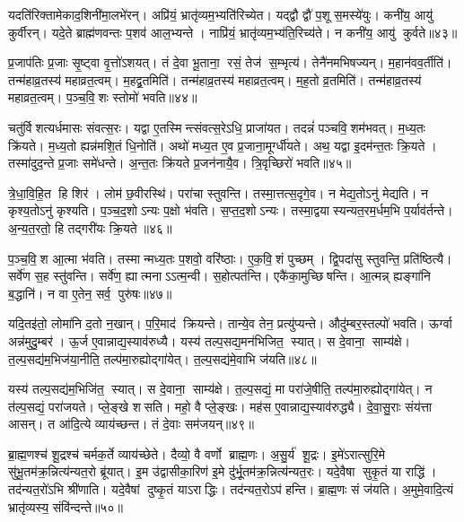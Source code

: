 यदति॑रिक्तामेकाद॒शिनी॑मा॒लभे॑रन्। अप्रि॑यं॒ भ्रातृ॑व्यम॒भ्यति॑\-रिच्येत। यद्द्वौ द्वौ॑ प॒शू स॒मस्ये॑युः। कनी॑य॒ आयु॑ कुर्वीरन्। यदे॒ते ब्राह्म॑णवन्तः प॒शव॑ आल॒भ्यन्ते। नाप्रि॑यं॒ भ्रातृ॑व्यम॒भ्य॑ति॒रिच्य॑ते। न कनी॑य॒ आयु॑ कुर्वते॥४३॥\anuvakamend[ते ए॒वाल॑भन्ते मैत्रावरु॒णीमाल॑भ॒न्तेऽव॑रुद्ध्यै स॒प्त च॑]

प्र॒जाप॑तिः प्र॒जाः सृ॒ष्ट्वा वृ॒त्तो॑ऽशयत्। तं दे॒वा भू॒ताना॒ रसं॒ तेज॑ स॒म्भृत्य॑। तेनै॑नमभिषज्यन्। म॒हान॑वव॒र्तीति॑। तन्म॑हाव्र॒तस्य॑ महाव्रत॒त्वम्। म॒हद्व्र॒तमिति॑। तन्म॑हाव्र॒तस्य॑ महाव्रत॒त्वम्। म॒ह॒तो व्र॒तमिति॑। तन्म॑हाव्र॒तस्य॑ महाव्रत॒त्वम्। प॒ञ्च॒वि॒शः स्तोमो॑ भवति॥४४॥

चतु॑र्विशत्यर्धमासः संवत्स॒रः। यद्वा ए॒तस्मिन्त्संवत्स॒रेऽधि॒ प्राजा॑यत। तदन्नं॑ पञ्चवि॒शम॑भवत्। म॒ध्य॒तः क्रि॑यते। म॒ध्य॒तो ह्यन्न॑मशि॒तं धि॒नोति॑। अथो॑ मध्य॒त ए॒व प्र॒जाना॒मूर्ग्धी॑यते। अथ॒ यद्वा इ॒दम॑न्त॒तः क्रि॒यते। तस्मा॑दुद॒न्ते प्र॒जाः समे॑धन्ते। अ॒न्त॒तः क्रि॑यते प्र॒जन॑नायै॒व। त्रि॒वृच्छिरो॑ भवति॥४५॥

त्रे॒धा॒वि॒हि॒त हि शिर॑। लोम॑ छ॒वीरस्थि॑। परा॑चा स्तुवन्ति। तस्मा॒त्तत्स॒दृगे॒व। न मेद्य॒तोऽनु॑ मेद्यति। न कृश्य॒तोऽनु॑ कृश्यति। प॒ञ्च॒द॒शोऽन्यः प॒क्षो भ॑वति। स॒प्त॒द॒शोऽन्यः। तस्मा॒द्वयास्यन्यत॒रम॒र्धम॒भि प॒र्याव॑र्तन्ते। अ॒न्य॒त॒रतो॒ हि तद्गरी॑यः क्रि॒यते॥४६॥

प॒ञ्च॒वि॒श आ॒त्मा भ॑वति। तस्मान्मध्य॒तः प॒शवो॒ वरि॑ष्ठाः। ए॒क॒वि॒शं पुच्छम्। द्वि॒पदा॑सु स्तुवन्ति॒ प्रति॑ष्ठित्यै। सर्वे॑ण स॒ह स्तु॑वन्ति। सर्वे॑ण॒ ह्यात्मनाऽऽत्म॒न्वी। स॒होत्पत॑न्ति। एकै॑का॒मुच्छिषन्ति। आ॒त्मन्न् ह्यङ्गा॑नि ब॒द्धानि॑। न वा ए॒तेन॒ सर्व॒ पुरु॑षः॥४७॥

यदि॒तइ॑तो॒ लोमा॑नि द॒तो न॒खान्। प॒रि॒माद॑ क्रियन्ते। तान्ये॒व तेन॒ प्रत्यु॑प्यन्ते। औदु॑म्बर॒स्तल्पो॑ भवति। ऊर्ग्वा अन्न॑मुदु॒म्बर॑। ऊ॒र्ज ए॒वान्नाद्य॒स्याव॑रुध्यै। यस्य॑ तल्प॒सद्य॒मन॑भिजित॒ स्यात्। स दे॒वाना॒ साम्य॑क्षे। त॒ल्प॒सद्य॑म॒भिज॑या॒नीति॒ तल्प॑मा॒रुह्योद्गा॑येत्। त॒ल्प॒सद्य॑मे॒वाभि ज॑यति॥४८॥

यस्य॑ तल्प॒सद्य॑म॒भिजि॑त॒ स्यात्। स दे॒वाना॒ साम्य॑क्षे। त॒ल्प॒सद्यं॒ मा परा॑जे॒षीति॒ तल्प॑मा॒रुह्योद्गा॑येत्। न त॑ल्प॒सद्यं॒ परा॑जयते। प्ले॒ङ्खे शसति। महो॒ वै प्ले॒ङ्खः। मह॑स ए॒वान्नाद्य॒स्याव॑रुद्ध्यै। दे॒वा॒सु॒राः संय॑त्ता आसन्। त आ॑दि॒त्ये व्याय॑च्छन्त। तं दे॒वाः सम॑जयन्॥४९॥

ब्रा॒ह्म॒णश्च॑ शू॒द्रश्च॑ चर्मक॒र्ते व्याय॑च्छेते। दैव्यो॒ वै वर्णो ब्राह्म॒णः। अ॒सु॒र्य॑ शू॒द्रः। इ॒मे॑ऽरात्सुरि॒मे सु॑भू॒तम॑क्र॒न्नित्य॑न्यत॒रो ब्रू॑यात्। इ॒म उ॑द्वासीका॒रिण॑ इ॒मे दु॑र्भू॒तम॑क्र॒न्नित्य॑न्यत॒रः। यदे॒वैषा सुकृ॒तं या राद्धि॑। तद॑न्यत॒रो॑ऽभि श्री॑णाति। यदे॒वैषां दुष्कृ॒तं याऽराद्धिः। तद॑न्यत॒रोऽप॑ हन्ति। ब्रा॒ह्म॒णः सं ज॑यति। अ॒मुमे॒वादि॒त्यं भ्रातृ॑व्यस्य॒ संवि॑न्दन्ते॥५०॥

